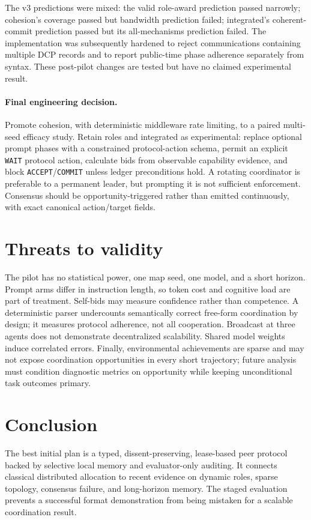\documentclass[11pt]{article}
\begin{document}
The v3 predictions were mixed: the valid role-award prediction passed narrowly; cohesion's coverage passed but bandwidth prediction failed; integrated's coherent-commit prediction passed but its all-mechanisms prediction failed. The implementation was subsequently hardened to reject communications containing multiple DCP records and to report public-time phase adherence separately from syntax. These post-pilot changes are tested but have no claimed experimental result.

\paragraph{Final engineering decision.} Promote cohesion, with deterministic middleware rate limiting, to a paired multi-seed efficacy study. Retain roles and integrated as experimental: replace optional prompt phases with a constrained protocol-action schema, permit an explicit \texttt{WAIT} protocol action, calculate bids from observable capability evidence, and block \texttt{ACCEPT}/\texttt{COMMIT} unless ledger preconditions hold. A rotating coordinator is preferable to a permanent leader, but prompting it is not sufficient enforcement. Consensus should be opportunity-triggered rather than emitted continuously, with exact canonical action/target fields.

\section{Threats to validity}
The pilot has no statistical power, one map seed, one model, and a short horizon. Prompt arms differ in instruction length, so token cost and cognitive load are part of treatment. Self-bids may measure confidence rather than competence. A deterministic parser undercounts semantically correct free-form coordination by design; it measures protocol adherence, not all cooperation. Broadcast at three agents does not demonstrate decentralized scalability. Shared model weights induce correlated errors. Finally, environmental achievements are sparse and may not expose coordination opportunities in every short trajectory; future analysis must condition diagnostic metrics on opportunity while keeping unconditional task outcomes primary.

\section{Conclusion}
The best initial plan is a typed, dissent-preserving, lease-based peer protocol backed by selective local memory and evaluator-only auditing. It connects classical distributed allocation to recent evidence on dynamic roles, sparse topology, consensus failure, and long-horizon memory. The staged evaluation prevents a successful format demonstration from being mistaken for a scalable coordination result.



\end{document}
